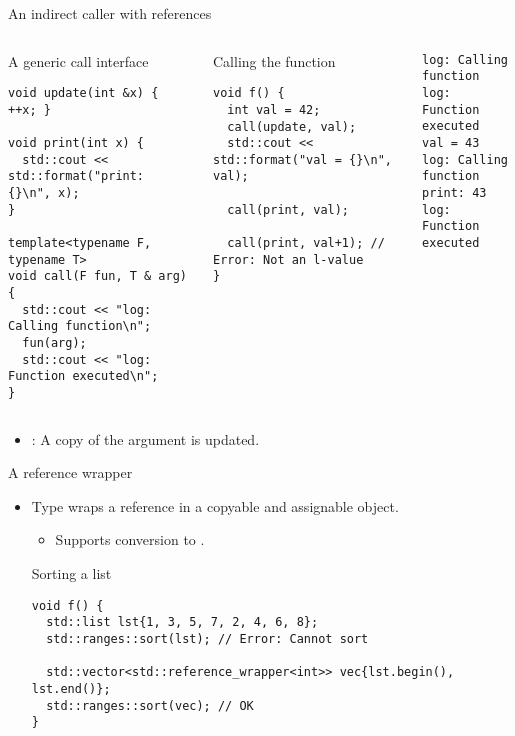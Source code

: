 \begin{frame}[t,fragile]{An indirect caller with references}
\begin{columns}[T]

\begin{block}{A generic call interface}
\begin{lstlisting}
void update(int &x) { ++x; }

void print(int x) {
  std::cout << std::format("print: {}\n", x);
}

template<typename F, typename T>
void call(F fun, T & arg) {
  std::cout << "log: Calling function\n";
  fun(arg);
  std::cout << "log: Function executed\n";
}
\end{lstlisting}
\end{block}

\pause
{}
\begin{block}{Calling the function}
\begin{lstlisting}[basicstyle=\tiny]
void f() {
  int val = 42;
  call(update, val);
  std::cout << std::format("val = {}\n", val);

  call(print, val);

  call(print, val+1); // Error: Not an l-value
}
\end{lstlisting}
\end{block}
\pause
\begin{lstlisting}[style=terminal,basicstyle=\tiny]
log: Calling function
log: Function executed
val = 43
log: Calling function
print: 43
log: Function executed
\end{lstlisting}

\end{columns}

\begin{itemize}
  \item {}: A copy of the argument is updated. 
\end{itemize}
\end{frame}

\begin{frame}[t,fragile]{A reference wrapper}
\begin{itemize}
  \item Type  wraps a reference in a copyable and assignable object.
    \begin{itemize}
      \item Supports conversion to .
    \end{itemize}

\begin{block}{Sorting a list}
\begin{lstlisting}
void f() {
  std::list lst{1, 3, 5, 7, 2, 4, 6, 8};
  std::ranges::sort(lst); // Error: Cannot sort

  std::vector<std::reference_wrapper<int>> vec{lst.begin(), lst.end()};
  std::ranges::sort(vec); // OK 
}
\end{lstlisting}
\end{block}
\end{itemize}
\end{frame}
